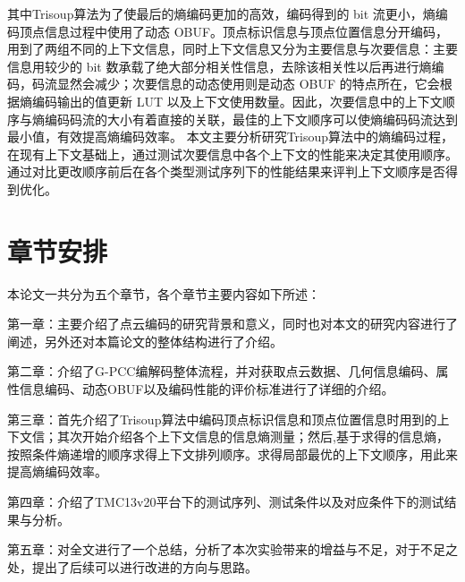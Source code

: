 \documentclass[bachelor,print,msfonts]{xduthesis}
\begin{document}
其中Trisoup算法为了使最后的熵编码更加的高效，编码得到的 bit 流更小，熵编码顶点信息过程中使用了动态 OBUF。顶点标识信息与顶点位置信息分开编码，用到了两组不同的上下文信息，同时上下文信息又分为主要信息与次要信息：主要信息用较少的 bit 数承载了绝大部分相关性信息，去除该相关性以后再进行熵编码，码流显然会减少；次要信息的动态使用则是动态 OBUF \cite{ref5}的特点所在，它会根据熵编码输出的值更新 LUT 以及上下文使用数量。因此，次要信息中的上下文顺序与熵编码码流的大小有着直接的关联，最佳的上下文顺序可以使熵编码码流达到最小值，有效提高熵编码效率。
本文主要分析研究Trisoup算法中的熵编码过程，在现有上下文基础上，通过测试次要信息中各个上下文的性能来决定其使用顺序。通过对比更改顺序前后在各个类型测试序列下的性能结果来评判上下文顺序是否得到优化。



\section{章节安排}
本论文一共分为五个章节，各个章节主要内容如下所述：

第一章：主要介绍了点云编码的研究背景和意义，同时也对本文的研究内容进行了阐述，另外还对本篇论文的整体结构进行了介绍。

第二章：介绍了G-PCC编解码整体流程，并对获取点云数据、几何信息编码、属性信息编码、动态OBUF以及编码性能的评价标准进行了详细的介绍。

第三章：首先介绍了Trisoup算法中编码顶点标识信息和顶点位置信息时用到的上下文信；其次开始介绍各个上下文信息的信息熵测量；然后,基于求得的信息熵，按照条件熵递增的顺序求得上下文排列顺序。求得局部最优的上下文顺序，用此来提高熵编码效率。

第四章：介绍了TMC13v20平台下的测试序列、测试条件以及对应条件下的测试结果与分析。

第五章：对全文进行了一个总结，分析了本次实验带来的增益与不足，对于不足之处，提出了后续可以进行改进的方向与思路。






%
%

\backmatter



%
%


%

%
%
%
%
\end{document}
